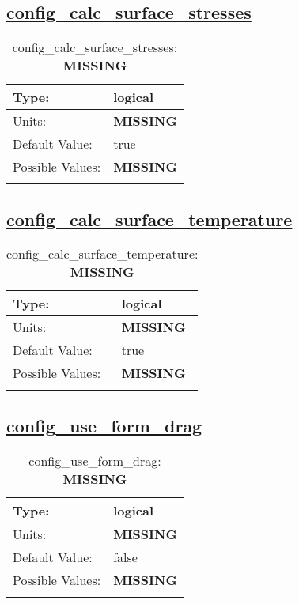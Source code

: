 \subsection[config\_calc\_surface\_stresses]{\hyperref[sec:nm_tab_atmosphere]{config\_calc\_surface\_stresses}}
\label{subsec:nm_sec_config_calc_surface_stresses}
\begin{center}
\begin{longtable}{| p{2.0in} || p{4.0in} |}
    \hline
    Type: & logical \\
    \hline
    Units: & {\bf \color{red} MISSING} \\
    \hline
    Default Value: & true \\
    \hline
    Possible Values: & {\bf \color{red} MISSING} \\
    \hline
    \caption{config\_calc\_surface\_stresses: {\bf \color{red} MISSING}}
\end{longtable}
\end{center}
\subsection[config\_calc\_surface\_temperature]{\hyperref[sec:nm_tab_atmosphere]{config\_calc\_surface\_temperature}}
\label{subsec:nm_sec_config_calc_surface_temperature}
\begin{center}
\begin{longtable}{| p{2.0in} || p{4.0in} |}
    \hline
    Type: & logical \\
    \hline
    Units: & {\bf \color{red} MISSING} \\
    \hline
    Default Value: & true \\
    \hline
    Possible Values: & {\bf \color{red} MISSING} \\
    \hline
    \caption{config\_calc\_surface\_temperature: {\bf \color{red} MISSING}}
\end{longtable}
\end{center}
\subsection[config\_use\_form\_drag]{\hyperref[sec:nm_tab_atmosphere]{config\_use\_form\_drag}}
\label{subsec:nm_sec_config_use_form_drag}
\begin{center}
\begin{longtable}{| p{2.0in} || p{4.0in} |}
    \hline
    Type: & logical \\
    \hline
    Units: & {\bf \color{red} MISSING} \\
    \hline
    Default Value: & false \\
    \hline
    Possible Values: & {\bf \color{red} MISSING} \\
    \hline
    \caption{config\_use\_form\_drag: {\bf \color{red} MISSING}}
\end{longtable}
\end{center}

